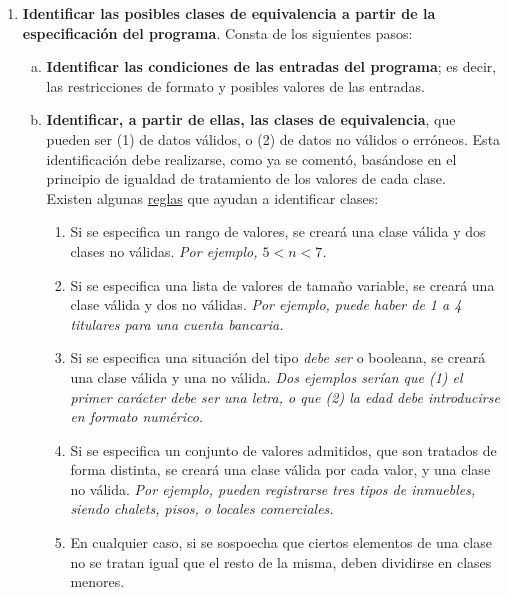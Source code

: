 \begin{enumerate}
    \item \textbf{Identificar las posibles clases de equivalencia a partir de la especificación del programa}. Consta de los siguientes pasos:
    
    \begin{enumerate}[a.]
        \item \textbf{Identificar las condiciones de las entradas del programa}; es decir, las restricciones de formato y posibles valores de las entradas.
        
        \item \textbf{Identificar, a partir de ellas, las clases de equivalencia}, que pueden ser (1) de datos válidos, o (2) de datos no válidos o erróneos. Esta identificación debe realizarse, como ya se comentó, basándose en el principio de igualdad de tratamiento de los valores de cada clase.\\
        
        Existen algunas \uline{reglas} que ayudan a identificar clases:

        \begin{enumerate}[R1.]
            \item Si se especifica un rango de valores, se creará una clase válida y dos clases no válidas. \textit{Por ejemplo, $5<n<7$.}
            \item Si se especifica una lista de valores de tamaño variable, se creará una clase válida y dos no válidas. \textit{Por ejemplo, puede haber de 1 a 4 titulares para una cuenta bancaria.}
            \item Si se especifica una situación del tipo \textit{debe ser} o booleana, se creará una clase válida y una no válida. \textit{Dos ejemplos serían que (1) el primer carácter debe ser una letra, o que (2) la edad debe introducirse en formato numérico.}
            \item Si se especifica un conjunto de valores admitidos, que son tratados de forma distinta, se creará una clase válida por cada valor, y una clase no válida. \textit{Por ejemplo, pueden registrarse tres tipos de inmuebles, siendo chalets, pisos, o locales comerciales.}
            \item En cualquier caso, si se sospoecha que ciertos elementos de una clase no se tratan igual que el resto de la misma, deben dividirse en clases menores.
        \end{enumerate}
    \end{enumerate}


\end{enumerate}

